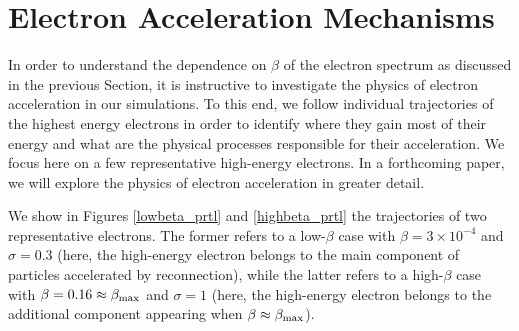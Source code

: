\section{Electron Acceleration Mechanisms}\label{mechanism}
In order to understand the dependence on $\beta$  of the electron spectrum as discussed in the previous Section, it is instructive to investigate the physics of electron acceleration in our simulations.  To this end, we follow individual trajectories of the highest energy electrons in order to identify where they gain most of their energy and what are the physical processes responsible for their acceleration. We focus here on a few representative high-energy electrons. In a forthcoming paper, we will explore the physics of electron acceleration in greater detail.

We show in Figures \ref{lowbeta_prtl} and \ref{highbeta_prtl} the trajectories of two representative electrons. The former refers to a low-$\beta$ case with $\beta=3\times 10^{-4}$ and $\sigma=0.3$ (here, the high-energy electron belongs to the main component of particles accelerated by reconnection), while the latter refers to a high-$\beta$ case with $\beta=0.16\approx \beta_{\rm max}$ and $\sigma=1$ (here, the high-energy electron belongs to the additional component appearing when $\beta\approx \beta_{\rm max}$).


